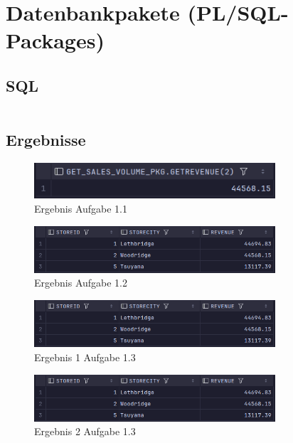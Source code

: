 \documentclass[12pt]{scrartcl}
\begin{document}
\section{Datenbankpakete (PL/SQL-Packages)}

\subsection{SQL}
\inputminted{sql}{../ue4_1.sql}

\subsection{Ergebnisse}
\begin{figure}[h]
	\centering
	\includegraphics[width=0.8\textwidth]{../ue4_1_1.png}
	\caption{Ergebnis Aufgabe 1.1}
\end{figure}

\begin{figure}[h]
	\centering
	\includegraphics[width=0.8\textwidth]{../ue4_1_2.png}
	\caption{Ergebnis Aufgabe 1.2}
\end{figure}

\begin{figure}[h]
	\centering
	\includegraphics[width=0.8\textwidth]{../ue4_1_3.png}
	\caption{Ergebnis 1 Aufgabe 1.3}
\end{figure}

\begin{figure}[h]
	\centering
	\includegraphics[width=0.8\textwidth]{../ue4_1_3.png}
	\caption{Ergebnis 2 Aufgabe 1.3}
\end{figure}
\end{document}
